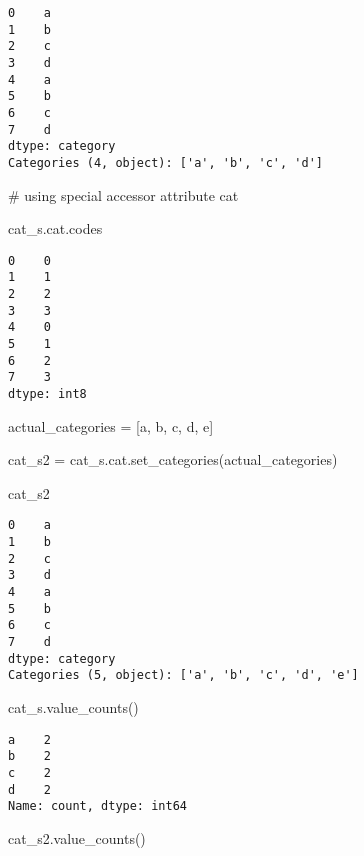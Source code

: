 \documentclass[
  letterpaper,
  DIV=11,
  numbers=noendperiod]{scrreprt}
\newenvironment{Shaded}{\begin{snugshade}}{\end{snugshade}}
\newcommand{\CommentTok}[1]{\textcolor[rgb]{0.37,0.37,0.37}{#1}}
\newcommand{\NormalTok}[1]{\textcolor[rgb]{0.00,0.23,0.31}{#1}}
\newcommand{\OperatorTok}[1]{\textcolor[rgb]{0.37,0.37,0.37}{#1}}
\newcommand{\StringTok}[1]{\textcolor[rgb]{0.13,0.47,0.30}{#1}}
\begin{document}
\begin{verbatim}
0    a
1    b
2    c
3    d
4    a
5    b
6    c
7    d
dtype: category
Categories (4, object): ['a', 'b', 'c', 'd']
\end{verbatim}

\begin{Shaded}
\begin{Highlighting}[]
\CommentTok{\# using special accessor attribute cat}

\NormalTok{cat\_s.cat.codes}
\end{Highlighting}
\end{Shaded}

\begin{verbatim}
0    0
1    1
2    2
3    3
4    0
5    1
6    2
7    3
dtype: int8
\end{verbatim}

\begin{Shaded}
\begin{Highlighting}[]
\NormalTok{actual\_categories }\OperatorTok{=}\NormalTok{ [}\StringTok{\textquotesingle{}a\textquotesingle{}}\NormalTok{, }\StringTok{\textquotesingle{}b\textquotesingle{}}\NormalTok{, }\StringTok{\textquotesingle{}c\textquotesingle{}}\NormalTok{, }\StringTok{\textquotesingle{}d\textquotesingle{}}\NormalTok{, }\StringTok{\textquotesingle{}e\textquotesingle{}}\NormalTok{]}

\NormalTok{cat\_s2 }\OperatorTok{=}\NormalTok{ cat\_s.cat.set\_categories(actual\_categories)}

\NormalTok{cat\_s2}
\end{Highlighting}
\end{Shaded}

\begin{verbatim}
0    a
1    b
2    c
3    d
4    a
5    b
6    c
7    d
dtype: category
Categories (5, object): ['a', 'b', 'c', 'd', 'e']
\end{verbatim}

\begin{Shaded}
\begin{Highlighting}[]
\NormalTok{cat\_s.value\_counts()}
\end{Highlighting}
\end{Shaded}

\begin{verbatim}
a    2
b    2
c    2
d    2
Name: count, dtype: int64
\end{verbatim}

\begin{Shaded}
\begin{Highlighting}[]
\NormalTok{cat\_s2.value\_counts()}
\end{Highlighting}
\end{Shaded}
\end{document}

